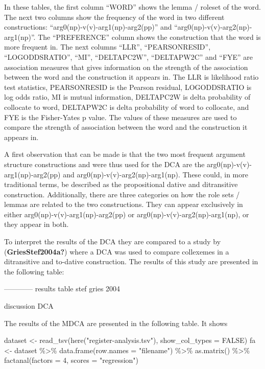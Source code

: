 \documentclass[
  letterpaper,
  DIV=11,
  numbers=noendperiod]{scrartcl}
\newenvironment{Shaded}{\begin{snugshade}}{\end{snugshade}}
\newcommand{\AttributeTok}[1]{\textcolor[rgb]{0.40,0.45,0.13}{#1}}
\newcommand{\ConstantTok}[1]{\textcolor[rgb]{0.56,0.35,0.01}{#1}}
\newcommand{\DecValTok}[1]{\textcolor[rgb]{0.68,0.00,0.00}{#1}}
\newcommand{\FunctionTok}[1]{\textcolor[rgb]{0.28,0.35,0.67}{#1}}
\newcommand{\NormalTok}[1]{\textcolor[rgb]{0.00,0.23,0.31}{#1}}
\newcommand{\OtherTok}[1]{\textcolor[rgb]{0.00,0.23,0.31}{#1}}
\newcommand{\SpecialCharTok}[1]{\textcolor[rgb]{0.37,0.37,0.37}{#1}}
\newcommand{\StringTok}[1]{\textcolor[rgb]{0.13,0.47,0.30}{#1}}
\begin{document}
In these tables, the first column ``WORD'' shows the lemma / roleset of
the word. The next two columns show the frequency of the word in two
different constructions: ``arg0(np)-v(v)-arg1(np)-arg2(pp)'' and
``arg0(np)-v(v)-arg2(np)-arg1(np)''. The ``PREFERENCE'' column shows the
construction that the word is more frequent in. The next columns
``LLR'', ``PEARSONRESID'', ``LOGODDSRATIO'', ``MI'', ``DELTAPC2W'',
``DELTAPW2C'' and ``FYE'' are association measures that gives
information on the strength of the association between the word and the
construction it appears in. The LLR is likelihood ratio test statistics,
PEARSONRESID is the Pearson residual, LOGODDSRATIO is log odds ratio, MI
is mutual information, DELTAPC2W is delta probability of collocate to
word, DELTAPW2C is delta probability of word to collocate, and FYE is
the Fisher-Yates p value. The values of these measures are used to
compare the strength of association between the word and the
construction it appears in.

A first observation that can be made is that the two most frequent
argument structure constructions and were thus used for the DCA are the
arg0(np)-v(v)-arg1(np)-arg2(pp) and arg0(np)-v(v)-arg2(np)-arg1(np).
These could, in more traditional terms, be described as the
propositional dative and ditransitive construction. Additionally, there
are three categories on how the role sets / lemmas are related to the
two constructions. They can appear exclusively in either
arg0(np)-v(v)-arg1(np)-arg2(pp) or arg0(np)-v(v)-arg2(np)-arg1(np), or
they appear in both.

To interpret the results of the DCA they are compared to a study by
(\textbf{GriesStef2004a?}) where a DCA was used to compare collexemes in
a ditransitive and to-dative construction. The results of this study are
presented in the following table:

------------ results table stef gries 2004

discussion DCA

The results of the MDCA are presented in the following table. It shows

\begin{Shaded}
\begin{Highlighting}[]
\NormalTok{dataset }\OtherTok{\textless{}{-}} \FunctionTok{read\_tsv}\NormalTok{(}\FunctionTok{here}\NormalTok{(}\StringTok{"register{-}analysis.tsv"}\NormalTok{), }\AttributeTok{show\_col\_types =} \ConstantTok{FALSE}\NormalTok{)}
\NormalTok{fa }\OtherTok{\textless{}{-}}\NormalTok{ dataset }\SpecialCharTok{\%\textgreater{}\%} \FunctionTok{data.frame}\NormalTok{(}\AttributeTok{row.names =} \StringTok{"filename"}\NormalTok{) }\SpecialCharTok{\%\textgreater{}\%} 
  \FunctionTok{as.matrix}\NormalTok{() }\SpecialCharTok{\%\textgreater{}\%} \FunctionTok{factanal}\NormalTok{(}\AttributeTok{factors =} \DecValTok{4}\NormalTok{, }\AttributeTok{scores =} \StringTok{"regression"}\NormalTok{)}
\end{Highlighting}
\end{Shaded}
\end{document}
